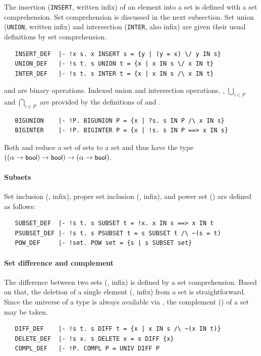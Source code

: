 {The insertion ({\small\verb+INSERT+}, written infix) of an element
into a set is defined with a set comprehension. Set comprehension is
discussed in the next subsection. Set union ({\small\verb+UNION+},
written infix) and intersection ({\small\verb+INTER+}, also infix)
are given their usual definitions by set comprehension.
\begin{hol}
\begin{verbatim}
   INSERT_DEF  |- !x s. x INSERT s = {y | (y = x) \/ y IN s}
   UNION_DEF   |- !s t. s UNION t = {x | x IN s \/ x IN t}
   INTER_DEF   |- !s t. s INTER t = {x | x IN s /\ x IN t}
\end{verbatim}
\end{hol}
 and  are binary
operations. Indexed union and intersection operations, \ie,
$\bigcup_{i \in P}$ and $\bigcap_{i \in P}$ are provided by the
definitions of   and .
\begin{hol}
\begin{verbatim}
   BIGUNION    |- !P. BIGUNION P = {x | ?s. s IN P /\ x IN s}
   BIGINTER    |- !P. BIGINTER P = {x | !s. s IN P ==> x IN s}
\end{verbatim}
\end{hol}
Both  and  reduce a set of sets to a
set and thus have the type
$((\alpha\to\mbox{\small{\textbf{\sf{bool}}}})\to\mbox{\small{\textbf{\sf{bool}}}})\to (\alpha\to\mbox{\small{\textbf{\sf{bool}}}})$.

\paragraph{Subsets}

Set inclusion (, infix), proper set inclusion
(, infix), and power set () are defined as
follows:
%
\begin{hol}
\begin{verbatim}
   SUBSET_DEF  |- !s t. s SUBSET t = !x. x IN s ==> x IN t
   PSUBSET_DEF |- !s t. s PSUBSET t = s SUBSET t /\ ~(s = t)
   POW_DEF     |- !set. POW set = {s | s SUBSET set}
\end{verbatim}
\end{hol}

\paragraph{Set difference and complement}

The difference between two sets (, infix) is defined by a
set comprehension. Based on that, the deletion of a single element
(, infix) from a set is straightforward. Since the
universe of a type is always available via , the
complement () of a set may be taken.
\begin{hol}
\begin{verbatim}
   DIFF_DEF    |- !s t. s DIFF t = {x | x IN s /\ ~(x IN t)}
   DELETE_DEF  |- !s x. s DELETE x = s DIFF {x}
   COMPL_DEF   |- !P. COMPL P = UNIV DIFF P
\end{verbatim}
\end{hol}

}
